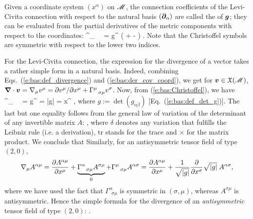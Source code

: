 Given a coordinate system $(x^\alpha)$ on $\mathscr{M}$, the connection coefficients of the
Levi-Civita connection with respect to the natural basis $(\bm{\partial}_\alpha)$
are called the  of $\bm{g}$; they
can be evaluated
from the partial derivatives of the metric components with respect to the coordinates:
\be \label{e:bas:Christoffel}
  \Gamma^\gamma_{\ \ \alpha\beta} =  g^{\gamma\mu}
    \left(  + 
    -  \right) .
\ee
Note that the Christoffel symbols are symmetric with respect to the lower two indices.

For the Levi-Civita connection, the expression for the divergence of a vector takes
a rather simple form in a natural basis.
Indeed, combining Eqs.~(\ref{e:bas:def_divergence}) and (\ref{e:bas:der_cov_coord}),
we get for $\bm{v}\in\mathfrak{X}(\mathscr{M})$,
$\bm{\nabla}\cdot\bm{v} = \nabla_\mu v^\mu = {\partial v^\mu}/{\partial x^\mu} + \Gamma^\mu_{\ \ \sigma\mu} v^\sigma $.
Now, from (\ref{e:bas:Christoffel}),  we have
\be \label{e:bas:trGam_det_g}
  \Gamma^\mu_{\ \ \alpha\mu} =   g^{\mu\nu} 
  =   \ln|g|
  = \der{} {x^\alpha}  ,
\ee
where $g := \det(g_{\alpha\beta})$ [Eq.~(\ref{e:bas:def_det_g})].
The last but one equality follows from the general law of variation of the determinant of any
invertible matrix $A$:
\be \label{e:bas:variation_det}
     ,
\ee
where $\delta$ denotes any variation that fulfills the Leibniz rule (i.e. a derivation),
$\mathrm{tr}$ stands for the trace and $\times$ for the matrix product.
We conclude that
\be \label{e:bas:div_vect}
\ee
Similarly, for an antisymmetric tensor field of type $(2,0)$,
\[
   \nabla_\mu A^{\alpha\mu}
  = \frac{\partial A^{\alpha\mu}}{\partial x^\mu} +
  \underbrace{\Gamma^\alpha_{\ \ \sigma\mu} A^{\sigma\mu}}_{0}
  + \Gamma^\mu_{\ \ \sigma\mu} A^{\alpha\sigma}
  = \frac{\partial A^{\alpha\mu}}{\partial x^\mu} +  \frac{1}{\sqrt{|g|}}\frac{\partial }{\partial x^\sigma} \sqrt{|g|}
  \;  A^{\alpha\sigma} ,
\]
where we have used the fact that $\Gamma^\alpha_{\ \ \sigma\mu}$ is symmetric in
$(\sigma,\mu)$, whereas $A^{\sigma\mu}$ is antisymmetric.
Hence the simple formula for the divergence of an \emph{antisymmetric} tensor field
of type $(2,0)$:
\be \label{e:bas:div_antisym}
   .
\ee


